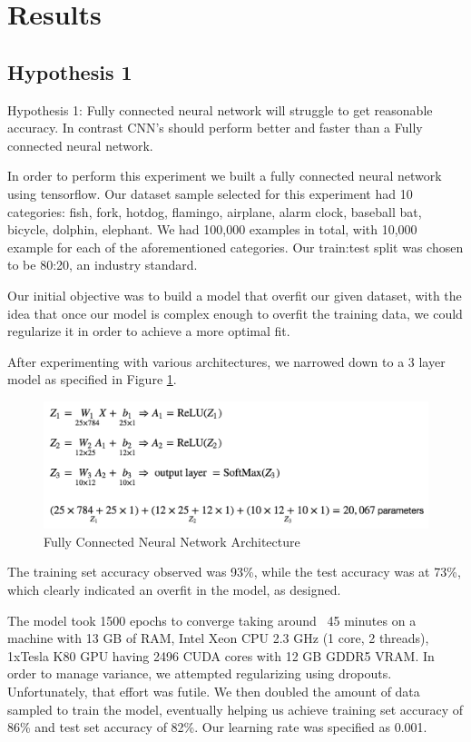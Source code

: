 \documentclass[12pt]{article}
\begin{document}
\section{Results}

\subsection{Hypothesis 1}

Hypothesis 1: Fully connected neural network will struggle to get reasonable
accuracy. In contrast CNN’s should perform better and faster than a Fully
connected neural network.

In order to perform this experiment we built a fully connected neural network
using tensorflow. Our dataset sample selected for this experiment had 10
categories: fish, fork, hotdog, flamingo, airplane, alarm clock, baseball bat,
bicycle, dolphin, elephant. We had 100,000 examples in total, with 10,000
example for each of the aforementioned categories. Our train:test split was
chosen to be 80:20, an industry standard. 

Our initial objective was to build a model that overfit our given dataset,
with the idea that once our model is complex enough to overfit the training
data, we could regularize it in order to achieve a more optimal fit.

After experimenting with various architectures, we narrowed down to a 3 layer
model as specified in Figure \ref{fig:fcnn}.

\begin{figure}[h]
  \begin{center}
    \includegraphics[scale=0.75]{fig2}
    \end{center}
  \caption{Fully Connected Neural Network Architecture}
  \label{fig:fcnn}
  \end{figure}

The training set accuracy observed was 93\%, while the test accuracy was at
73\%, which clearly indicated an overfit in the model, as designed.

The model took 1500 epochs to converge taking around ~45 minutes on a machine with 13 GB of RAM, Intel Xeon CPU 2.3 GHz (1 core, 2 threads), 1xTesla K80 GPU having 2496 CUDA cores with 12 GB GDDR5 VRAM. In order to manage variance, we attempted regularizing using dropouts. Unfortunately, that effort was futile. We then doubled the amount of data sampled to train the model, eventually helping us achieve training set accuracy of 86\% and test set accuracy of 82\%. Our
learning rate was specified as 0.001.
\end{document}
